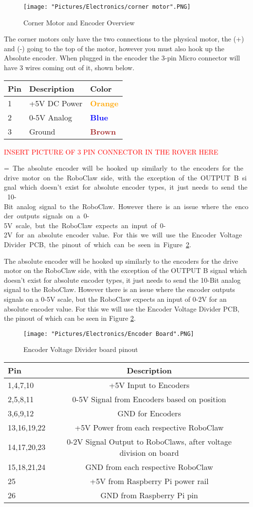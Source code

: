 \documentclass[12pt]{article}
\makeatletter
\newcommand{\mybox}[1]{%
  \setbox0=\hbox{#1}%
  \setlength{\@tempdima}{\dimexpr\wd0+13pt}%
  \begin{tcolorbox}[colframe=mycolor,boxrule=0.5pt,arc=4pt,
      left=6pt,right=6pt,top=6pt,bottom=6pt,boxsep=0pt,width=0.95\textwidth]
    #1
  \end{tcolorbox}
}
\makeatother
\begin{document}
\begin{figure}[H]
  	\centering
    	\texttt{[image: "Pictures/Electronics/corner motor".PNG]}
 	\caption{Corner Motor and Encoder Overview}
	\label{corner motors over}
\end{figure}

 The corner motors only have the two connections to the physical motor, the (+) and (-) going to the top of the motor, however you must also hook up the Absolute encoder. When plugged in the encoder the 3-pin Micro connector will have 3 wires coming out of it, shown below.

\bigskip
\begin{tabular}[3] {| p{3cm} | p{7cm} | p{3cm} | }
	\hline
	\textbf{Pin} & \textbf{Description} & \textbf{Color} \\ \hline
	1 & +5V DC Power & \textcolor{orange}{\textbf{Orange}} \\ \hline
	2 & 0-5V Analog & \textcolor{blue}{\textbf{Blue}} \\ \hline
	3 & Ground & \textcolor{brown}{\textbf{Brown}} \\ \hline
\end{tabular}

\bigskip 

\textcolor{red}{INSERT PICTURE OF 3 PIN CONNECTOR IN THE ROVER HERE}


\mybox{
The absolute encoder will be hooked up similarly to the encoders for the drive motor on the RoboClaw side, with the exception of the OUTPUT B signal which doesn't exist for absolute encoder types, it just needs to send the 10-Bit analog signal to the RoboClaw. However there is an issue where the encoder outputs signals on a 0-5V scale, but the RoboClaw expects an input of 0-2V for an absolute encoder value. For this we will use the Encoder Voltage Divider PCB, the pinout of which can be seen in Figure \ref{vd pinout}. 
}

\begin{figure}[H]
 	\centering
	\texttt{[image: "Pictures/Electronics/Encoder Board".PNG]}
 	\caption{Encoder Voltage Divider board pinout}
	\label{vd pinout}
\end{figure}

\begin{tabular}[2] {| l | c |}
	\hline
	\textbf{Pin} & \textbf{Description} \\ \hline
	1,4,7,10 & +5V Input to Encoders \\ \hline
	2,5,8,11 & 0-5V Signal from Encoders based on position \\ \hline
	3,6,9,12 & GND for Encoders \\ \hline \hline
	13,16,19,22 & +5V Power from each respective RoboClaw \\ \hline
	14,17,20,23 & 0-2V Signal Output to RoboClaws, after voltage division on board \\ \hline
	15,18,21,24 & GND from each respective RoboClaw \\ \hline \hline
	25 & +5V from Raspberry Pi power rail \\ \hline
	26 & GND from Raspberry Pi pin \\ \hline
\end{tabular}
\end{document}
